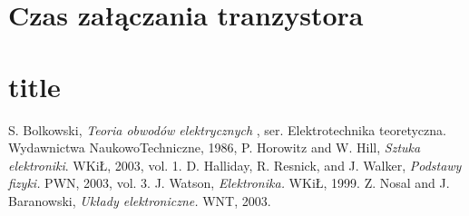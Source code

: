 \documentclass[polish,polish,a4paper]{article}
\begin{document}
\section{Czas załączania tranzystora}

\section{title}
	\begin{thebibliography}{99}
		S. Bolkowski,  \emph{Teoria obwodów elektrycznych} , ser. Elektrotechnika teoretyczna. Wydawnictwa NaukowoTechniczne,
		1986, 
		P. Horowitz and W. Hill, \emph{Sztuka elektroniki}. WKiŁ, 2003, vol. 1.
		D. Halliday, R. Resnick, and J. Walker, \emph{Podstawy fizyki.} PWN, 2003, vol. 3.
		J. Watson,\emph{ Elektronika.} WKiŁ, 1999.
		Z. Nosal and J. Baranowski, \emph{Układy elektroniczne.} WNT, 2003.
	\end{thebibliography}
	\newpage
	\tableofcontents
		
\end{document}
